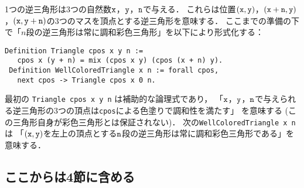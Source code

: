 1つの逆三角形は3つの自然数${\tt x}$，${\tt y}$，${\tt n}$で与える．
これらは位置$({\tt x},{\tt y})$，$({\tt x}+{\tt n},{\tt y})$，$({\tt x},{\tt y}+{\tt n})$の3つのマスを頂点とする逆三角形を意味する．
ここまでの準備の下で「$n$段の逆三角形は常に調和彩色三角形」を以下により形式化する：
\begin{lstlisting}[language=Coq]
 Definition Triangle cpos x y n :=
   cpos x (y + n) = mix (cpos x y) (cpos (x + n) y).
 Definition WellColoredTriangle x n := forall cpos,
   next cpos -> Triangle cpos x 0 n.
\end{lstlisting}
最初の {\tt Triangle cpos x y n} は補助的な論理式であり，
「${\tt x}$，${\tt y}$，${\tt n}$で与えられる逆三角形の3つの頂点は{\tt cpos}による色塗りで調和性を満たす」
を意味する (この三角形自身が彩色三角形とは保証されない)．
次の{\tt WellColoredTriangle x n} は
「$({\tt x},{\tt y})$を左上の頂点とする${\tt n}$段の逆三角形は常に調和彩色三角形である」を意味する．








\subsection{ここからは4節に含める}





